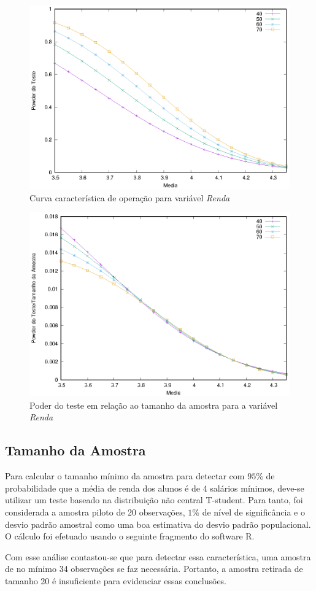 	\begin{figure}
		\centering
		\includegraphics[width=0.8\linewidth]{questao2/powers.eps}
		\caption{Curva característica de operação para variável \textit{Renda}}
		\label{figure: poder do teste renda}
	\end{figure}

	\begin{figure}
		\centering
		\includegraphics[width=0.8\linewidth]{questao2/powers-breakdown.eps}
		\caption{Poder do teste em relação ao tamanho da amostra para a variável \textit{Renda}}
		\label{figure: poder do teste e tamanho da amostra renda}
	\end{figure}

\subsection{Tamanho da Amostra}

	Para calcular o tamanho mínimo da amostra para detectar com $95\%$ de
	probabilidade que a média de renda dos alunos é de 4 salários mínimos,
	deve-se utilizar um teste baseado na distribuição não central T-student.
	Para tanto, foi considerada a amostra piloto de 20 observações, $1\%$ de
	nível de significância e o desvio padrão amostral como uma boa estimativa do
	desvio padrão populacional. O cálculo foi efetuado usando o seguinte
	fragmento do software R.

	Com esse análise contastou-se que para detectar essa característica, uma
	amostra de no mínimo 34 observações se faz necessária. Portanto, a amostra
	retirada de tamanho 20 é insuficiente para evidenciar essas conclusões.
